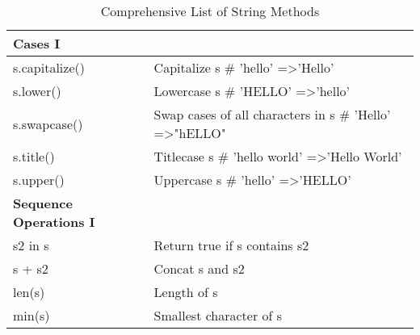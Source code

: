 \documentclass[a4paper,11pt]{book}
\numberwithin{figure}{chapter}
\numberwithin{table}{chapter}
\begin{document}
\begin{appendices}
\begin{table}[!htbp]
\centering
\caption{Comprehensive List of String Methods}
\label{tab:string_methods}
\begin{tabular}{lp{12cm}}
\toprule \toprule
\textbf{Cases I}          &                                                                                                                                               \\ \midrule
s.capitalize()           & Capitalize s \# 'hello' =\textgreater 'Hello'                                                                                                   \\
s.lower()                & Lowercase s \# 'HELLO' =\textgreater 'hello'                                                                                                    \\
s.swapcase()             & Swap cases of all characters in s \# 'Hello' =\textgreater "hELLO"                                                                              \\
s.title()                & Titlecase s \# 'hello world' =\textgreater 'Hello World'                                                                                        \\
s.upper()                & Uppercase s \# 'hello' =\textgreater 'HELLO'                                                                                                    \\ \midrule
\textbf{Sequence Operations I}    &                                                                                                                                                 \\ \midrule
s2 in s                  & Return true if s contains s2                                                                                                                    \\
s + s2                   & Concat s and s2                                                                                                                                 \\
len(s)                   & Length of s                                                                                                                                     \\
min(s)                   & Smallest character of s                                                                                                                         \\

\end{tabular}
\end{table}
\end{appendices}
\end{document}
